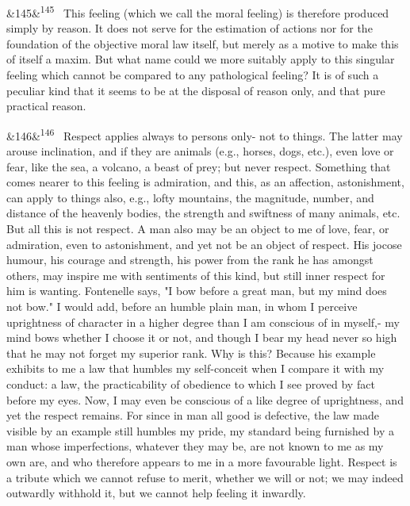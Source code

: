 \documentclass[12pt]{article}
\newcommand{\para}[1][]{\par\noindent\ifx&#1&\else\textsuperscript{\footnotesize #1}~\fi}
\begin{document}
\para[145] This feeling (which we call the moral feeling) is therefore produced simply by reason. It does not serve for the estimation of actions nor for the foundation of the objective moral law itself, but merely as a motive to make this of itself a maxim. But what name could we more suitably apply to this singular feeling which cannot be compared to any pathological feeling? It is of such a peculiar kind that it seems to be at the disposal of reason only, and that pure practical reason.

\para[146] Respect applies always to persons only- not to things. The latter may arouse inclination, and if they are animals (e.g., horses, dogs, etc.), even love or fear, like the sea, a volcano, a beast of prey; but never respect. Something that comes nearer to this feeling is admiration, and this, as an affection, astonishment, can apply to things also, e.g., lofty mountains, the magnitude, number, and distance of the heavenly bodies, the strength and swiftness of many animals, etc. But all this is not respect. A man also may be an object to me of love, fear, or admiration, even to astonishment, and yet not be an object of respect. His jocose humour, his courage and strength, his power from the rank he has amongst others, may inspire me with sentiments of this kind, but still inner respect for him is wanting. Fontenelle says, "I bow before a great man, but my mind does not bow." I would add, before an humble plain man, in whom I perceive uprightness of character in a higher degree than I am conscious of in myself,- my mind bows whether I choose it or not, and though I bear my head never so high that he may not forget my superior rank. Why is this? Because his example exhibits to me a law that humbles my self-conceit when I compare it with my conduct: a law, the practicability of obedience to which I see proved by fact before my eyes. Now, I may even be conscious of a like degree of uprightness, and yet the respect remains. For since in man all good is defective, the law made visible by an example still humbles my pride, my standard being furnished by a man whose imperfections, whatever they may be, are not known to me as my own are, and who therefore appears to me in a more favourable light. Respect is a tribute which we cannot refuse to merit, whether we will or not; we may indeed outwardly withhold it, but we cannot help feeling it inwardly.
\end{document}
